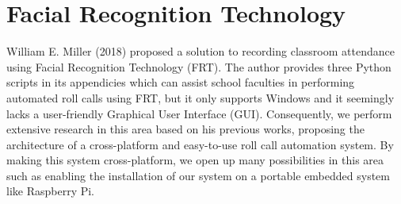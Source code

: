 \section{Facial Recognition Technology}
William E. Miller (2018) proposed a solution to recording classroom attendance using
Facial Recognition Technology (FRT). The author provides three Python scripts in its
appendicies which can assist school faculties in performing automated roll calls using FRT,
but it only supports Windows and it seemingly lacks a user-friendly Graphical User Interface (GUI). 
Consequently, we perform extensive research in this area based on his previous works,
proposing the architecture of a cross-platform and easy-to-use roll call automation system.
By making this system cross-platform, we open up many possibilities in this area such as
enabling the installation of our system on a portable embedded system like Raspberry Pi.
